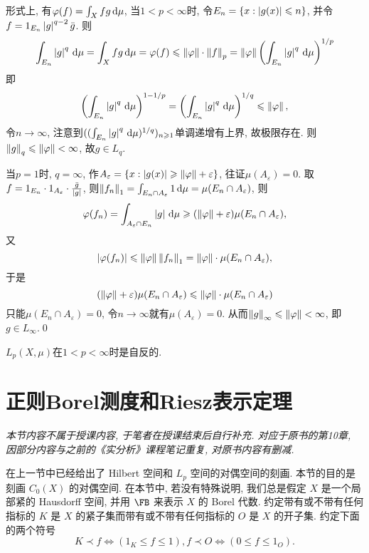 \begin{Proof}
		形式上, 有$ \varphi(f)=\int_Xfg\,\mathrm{d}\mu $, 当$ 1<p<\infty $时, 令$ E_n=\{ x : \left| g(x) \right| \leqslant n \} $, 并令$ f=1_{E_n}\left| g \right| ^{q-2}\bar{g} $. 则
		\[
		\int_{E_n}\left| g \right| ^q\,\mathrm{d}\mu=\int_Xfg\,\mathrm{d}\mu=\varphi(f)\leqslant\left\| \varphi \right\|\cdot\left\| f \right\|_p=\left\| \varphi \right\|\left(\int_{E_n}\left| g \right| ^q\,\mathrm{d}\mu\right)^{1/p}
		\]
		即
		\[
		\left(\int_{E_n}\left| g \right| ^q\,\mathrm{d}\mu\right)^{1-1/p}=\left( \int_{E_n}\left| g \right| ^q\,\mathrm{d}\mu \right)^{1/q}\leqslant\left\| \varphi \right\|,
		\]
		令$ n\to\infty $, 注意到$ ((\int_{E_n}\left| g \right| ^q\,\mathrm{d}\mu)^{1/q})_{n\geqslant 1} $单调递增有上界, 故极限存在. 则$ \left\| g \right\|_q\leqslant\left\| \varphi \right\|<\infty $, 故$ g\in L_q $.
	
		当$ p=1 $时, $ q=\infty $, 作$ A_\varepsilon=\{ x : \left| g(x) \right| \geqslant\left\| \varphi \right\|+\varepsilon \} $, 往证$ \mu(A_\varepsilon)=0 $. 取$ f=1_{E_n}\cdot1_{A_\varepsilon}\cdot\frac{\bar{g}}{\left| g \right| } $, 则$ \left\| f_n \right\|_1=\int_{E_n\cap A_\varepsilon}1\,\mathrm{d}\mu=\mu(E_n\cap A_\varepsilon) $, 则
		\[
		\varphi(f_n)=\int_{A_\varepsilon\cap E_n}\left| g \right| \,\mathrm{d}\mu\geqslant(\left\| \varphi \right\|+\varepsilon)\mu(E_n\cap A_\varepsilon),
		\]
		又
		\[
		\left| \varphi(f_n) \right| \leqslant\left\| \varphi \right\|\left\| f_n \right\|_1=\left\| \varphi \right\|\cdot\mu(E_n\cap A_\varepsilon),
		\]
		于是
		\[
		(\left\| \varphi \right\|+\varepsilon)\mu(E_n\cap A_\varepsilon)\leqslant\left\| \varphi \right\|\cdot\mu(E_n\cap A_\varepsilon)
		\]
		只能$ \mu(E_n\cap A_\varepsilon)=0 $, 令$ n\to\infty $就有$ \mu(A_\varepsilon)=0 $. 从而$ \left\| g \right\|_\infty\leqslant\left\| \varphi \right\|<\infty $, 即$ g\in L_\infty $.\qed
	\end{Proof}
	
	\begin{Corollary}
		$ L_p(X,\mu) $在$ 1<p<\infty $时是自反的.
	\end{Corollary}

\section{正则Borel测度和Riesz表示定理}

	\textsl{本节内容不属于授课内容, 于笔者在授课结束后自行补充. 对应于原书的第10章, 因部分内容与之前的《实分析》课程笔记重复, 对原书内容有删减.}
	
	在上一节中已经给出了 Hilbert 空间和 $ L_p $ 空间的对偶空间的刻画. 本节的目的是刻画 $ C_0(X) $ 的对偶空间. 在本节中, 若没有特殊说明, 我们总是假定 $ X $ 是一个局部紧的 Hausdorff 空间, 并用 $ \FB $ 来表示 $ X $ 的 Borel 代数. 约定带有或不带有任何指标的 $ K $ 是 $ X $ 的紧子集而带有或不带有任何指标的 $ O $ 是 $ X $ 的开子集. 约定下面的两个符号
	\[
		K\prec f\Longleftrightarrow (1_K\leqslant f\leqslant 1), f\prec O\Longleftrightarrow (0\leqslant f\leqslant 1_O).
	\]
	
